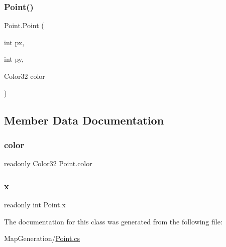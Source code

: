 \subsubsection{\texorpdfstring{Point()}{Point()}\hspace{0.1cm}{\footnotesize\ttfamily [2/2]}}
{\footnotesize\ttfamily Point.\+Point (\begin{DoxyParamCaption}\item[{int}]{px,  }\item[{int}]{py,  }\item[{Color32}]{color }\end{DoxyParamCaption})}



\subsection{Member Data Documentation}
\mbox{\label{class_point_a353867b30168d06c7736f33dad034d89}} 
\subsubsection{\texorpdfstring{color}{color}}
{\footnotesize\ttfamily readonly Color32 Point.\+color}

\mbox{\label{class_point_af9fd50a73619d705a638fcbb017f241f}} 
\subsubsection{\texorpdfstring{x}{x}}
{\footnotesize\ttfamily readonly int Point.\+x}



The documentation for this class was generated from the following file\+:\begin{DoxyCompactItemize}
\item 
Map\+Generation/\mbox{\hyperlink{_point_8cs}{Point.\+cs}}\end{DoxyCompactItemize}
